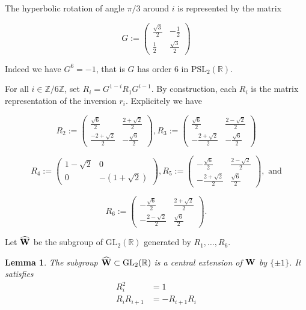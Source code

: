 \documentclass[12pt]{amsart}
\newcommand{\R}{\mathbb{R}}
\newcommand{\Z}{\mathbb{Z}}
\newcommand{\GL}{{\mathrm {GL}}}
\newcommand{\PSL}{{\mathrm {PSL}}}
\newtheorem{lemma}{Lemma}
\begin{document}
The hyperbolic rotation of angle $\pi/3$ around $i$ 
is  represented by the matrix


$$G:=\begin{pmatrix}
\frac{\sqrt{3}}{2} & -\frac{1}{2}\\
\frac{1}{2} & \frac{\sqrt{3}}{2}
\end{pmatrix}$$

\noindent Indeed we have $G^6=-1$, that is $G$ has order $6$
in $\PSL_2(\R)$.

 For all $i\in\Z/6\Z$, set  $R_i=G^{1-i}R_1G^{i-1}$. By construction, each $R_i$ is the matrix representation of the inversion $r_i$.  Explicitely we have

$$R_2:=\begin{pmatrix}
\frac{\sqrt{6}}{2}& \frac{2+\sqrt{2}}{2}\\
\frac{-2+\sqrt{2}}{2} &-\frac{\sqrt{6}}{2}
\end{pmatrix},
R_3:=\begin{pmatrix}
\frac{\sqrt{6}}{2}& \frac{2-\sqrt{2}}{2}\\
-\frac{2+\sqrt{2}}{2} &-\frac{\sqrt{6}}{2}
\end{pmatrix}
$$

$$R_4:=\begin{pmatrix}
1-\sqrt{2} & 0\\
0 &-(1+ \sqrt{2})
\end{pmatrix},
R_5:=\begin{pmatrix}
-\frac{\sqrt{6}}{2}& \frac{2-\sqrt{2}}{2}\\
-\frac{2+\sqrt{2}}{2} &\frac{\sqrt{6}}{2}
\end{pmatrix}, \text{ and}$$


$$R_6:=\begin{pmatrix}
-\frac{\sqrt{6}}{2}& \frac{2+\sqrt{2}}{2}\\
-\frac{2-\sqrt{2}}{2} &\frac{\sqrt{6}}{2}
\end{pmatrix}.$$


Let $\widehat{\bf W}$ be the subgroup of $\GL_2(\R)$ generated by  
$R_1,\ldots,R_6$.

\begin{lemma} The subgroup $\widehat{\bf W}\subset\GL_2(\R)$  is a central extension of
$\bf{W}$ by $\{\pm 1\}$. It satisfies
\begin{align}
R_i^2&=1\label{cover1}\\
R_iR_{i+1}&=-R_{i+1}R_i\label{cover2}
\end{align}
\end{lemma}
\end{document}

